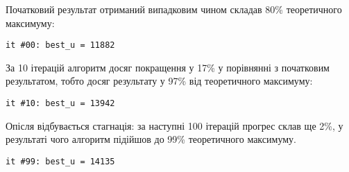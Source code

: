 \documentclass[a4paper, 12pt]{article}
\numberwithin{equation}{section}
\begin{document}
Початковий результат отриманий випадковим чином складав 80\% теоретичного максимуму:
\begin{verbatim}
it #00: best_u = 11882
\end{verbatim}

За 10 ітерацій алгоритм досяг покращення у 17\% у порівнянні з початковим результатом, тобто досяг результату у 97\% від теоретичного максимуму:
\begin{verbatim}
it #10: best_u = 13942
\end{verbatim}

Опісля відбувається стагнація: за наступні 100 ітерацій прогрес склав ще 2\%, у результаті чого алгоритм підійшов до 99\% теоретичного максимуму.
\begin{verbatim}
it #99: best_u = 14135
\end{verbatim}
\end{document}
